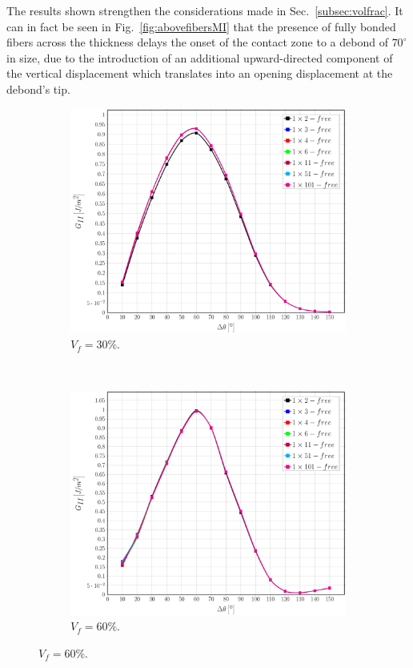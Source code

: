 \documentclass[review]{elsarticle}
\begin{document}
The results shown strengthen the considerations made in Sec.~\ref{subsec:volfrac}. It can in fact be seen in Fig.~\ref{fig:abovefibersMI} that the presence of fully bonded fibers across the thickness delays the onset of the contact zone to a debond of $70^{\circ}$ in size, due to the introduction of an additional upward-directed component of the vertical displacement which translates into an opening displacement at the debond's tip.

\begin{figure}[!h]
\centering
    \begin{subfigure}[b]{0.45\textwidth}
        \includegraphics[width=\textwidth]{abovefibers-vf30-GII.pdf}
        \caption{$V_{f}=30\%$.}\label{subfig:abovefiber30MII}
    \end{subfigure} ~
    \begin{subfigure}[b]{0.45\textwidth}
        \includegraphics[width=\textwidth]{abovefibers-vf60-GII.pdf}
        \caption{$V_{f}=60\%$.}\label{subfig:abovefiber60MII}
    \end{subfigure}


\end{figure}
\end{document}
